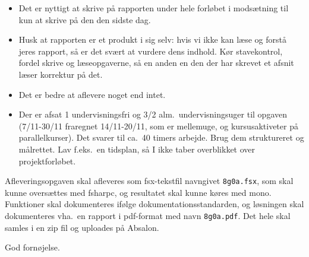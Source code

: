 \documentclass[a4paper,12pt]{article}
\begin{document}
\begin{enumerate}[label=8g.\arabic*,start=0]
\begin{itemize}
  \item Det er nyttigt at skrive på rapporten under hele forløbet i modsætning til kun at skrive på den den sidste dag.
  \item Husk at rapporten er et produkt i sig selv: hvis vi ikke kan læse og forstå jeres rapport, så er det svært at vurdere dens indhold. Kør stavekontrol, fordel skrive og læseopgaverne, så en anden en den der har skrevet et afsnit læser korrektur på det.
  \item Det er bedre at aflevere noget end intet.
  \item Der er afsat 1 undervisningsfri og 3/2 alm.\ undervisningsuger til opgaven (7/11-30/11 fraregnet 14/11-20/11, som er mellemuge, og kursusaktiveter på parallelkurser). Det svarer til ca.\ 40 timers arbejde. Brug dem struktureret og målrettet. Lav f.eks.\ en tidsplan, så I ikke taber overblikket over projektforløbet.
  \end{itemize}
\end{enumerate}
Afleveringsopgaven skal afleveres som fsx-tekstfil navngivet \lstinline!8g0a.fsx!, som skal kunne oversættes med fsharpc, og resultatet skal kunne køres med mono. Funktioner skal dokumenteres ifølge dokumentationsstandarden, og løsningen skal dokumenteres vha.\ en rapport i pdf-format med navn  \lstinline!8g0a.pdf!. Det hele skal samles i en zip fil og uploades på Absalon.

\flushright God fornøjelse.
\end{document}
